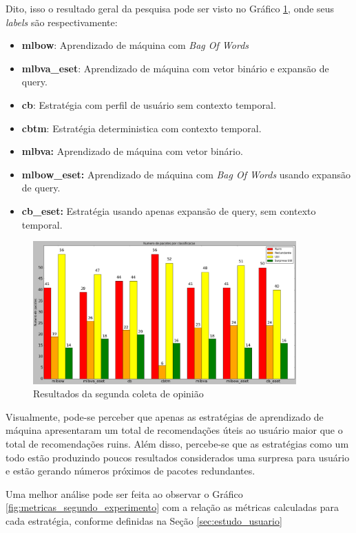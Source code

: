 Dito, isso o resultado geral da pesquisa pode ser visto no Gráfico
\ref{fig:segundo_experimento}, onde seus \textit{labels} são respectivamente:

\begin{itemize}
    \item \textbf{mlbow}: Aprendizado de máquina com \textit{Bag Of Words}
    \item \textbf{mlbva\_eset}: Aprendizado de máquina com vetor binário e
    expansão de query.
    \item \textbf{cb}: Estratégia com perfil de usuário sem contexto temporal.
    \item \textbf{cbtm}: Estratégia deterministica com contexto temporal.
    \item \textbf{mlbva:} Aprendizado de máquina com vetor binário.
    \item \textbf{mlbow\_eset:} Aprendizado de máquina com \textit{Bag Of Words}
        usando expansão de query.
    \item \textbf{cb\_eset:} Estratégia usando apenas expansão de query, sem
        contexto temporal.
\end{itemize}

\begin{figure}[h]
  \centering
  \includegraphics[width=0.9\textwidth]{figuras/segundo_experimento.eps}
  \caption{Resultados da segunda coleta de opinião}
  \label{fig:segundo_experimento}
\end{figure}

Visualmente, pode-se perceber que apenas as estratégias de aprendizado de
máquina apresentaram um total de recomendações úteis ao usuário maior que o
total de recomendações ruins. Além disso, percebe-se que as estratégias como um
todo estão produzindo poucos resultados considerados uma surpresa para usuário e
estão gerando números próximos de pacotes redundantes.

Uma melhor análise pode ser feita ao observar o Gráfico
\ref{fig:metricas_segundo_experimento} com a relação as métricas calculadas para cada
estratégia, conforme definidas na Seção \ref{sec:estudo_usuario}

